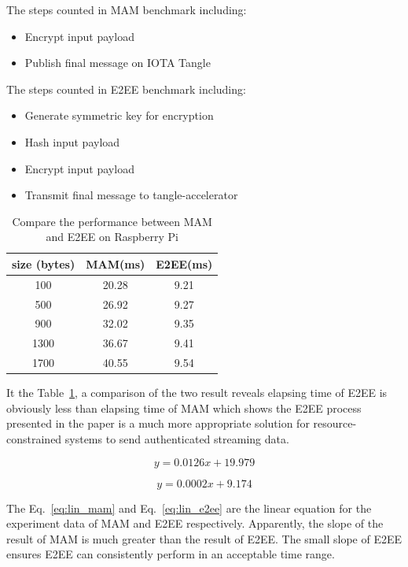 \begin{spacing}{2.0}
The steps counted in MAM benchmark including:
\begin{itemize}
    \item Encrypt input payload
    \item Publish final message on IOTA Tangle
\end{itemize}

The steps counted in E2EE benchmark including:
\begin{itemize}
    \item Generate symmetric key for encryption
    \item Hash input payload
    \item Encrypt input payload
    \item Transmit final message to tangle-accelerator
\end{itemize}

\begin{table}[htbp]
    \caption{Compare the performance between MAM and E2EE on Raspberry Pi}
    \label{tab:mam_vs_e2ee}
		\centering
        \begin{tabular}{|c||c|c|}
        \hline
            \textbf{size (bytes)} & \textbf{MAM(ms)} & \textbf{E2EE(ms)} \\
            \hline
            100 & 20.28 & 9.21 \\
            500 &  26.92 & 9.27 \\
            900 & 32.02 &  9.35  \\
            1300 & 36.67 & 9.41 \\
            1700 & 40.55 & 9.54 \\
            \hline
        \end{tabular}
\end{table}

It the Table~\ref{tab:mam_vs_e2ee}, a comparison of the two result reveals elapsing time of E2EE is obviously less than elapsing time of MAM which shows the E2EE process presented in the paper is a much more appropriate solution for resource-constrained systems to send authenticated streaming data.

\begin{equation}
\label{eq:lin_mam}
y=0.0126 x+19.979
\end{equation}

\begin{equation}
\label{eq:lin_e2ee}
y=0.0002 x+9.174
\end{equation}

The Eq.~\ref{eq:lin_mam} and Eq.~\ref{eq:lin_e2ee} are the linear equation for the experiment data of MAM and E2EE respectively. Apparently, the slope of the result of MAM is much greater than the result of E2EE. The small slope of E2EE ensures E2EE can consistently perform in an acceptable time range.


\end{spacing}
